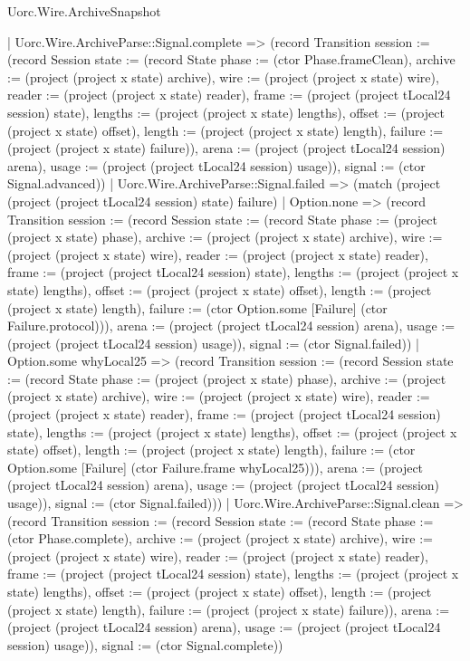 \begin{lexlean}{Uorc.Wire.ArchiveSnapshot}
\begin{semanticmodule}
{        | Uorc.Wire.ArchiveParse::Signal.complete => (record Transition {session := (record Session {state := (record State {phase := (ctor Phase.frameClean), archive := (project (project x state) archive), wire := (project (project x state) wire), reader := (project (project x state) reader), frame := (project (project tLocal24 session) state), lengths := (project (project x state) lengths), offset := (project (project x state) offset), length := (project (project x state) length), failure := (project (project x state) failure)}), arena := (project (project tLocal24 session) arena), usage := (project (project tLocal24 session) usage)}), signal := (ctor Signal.advanced)})
        | Uorc.Wire.ArchiveParse::Signal.failed => (match (project (project (project tLocal24 session) state) failure)
          | Option.none => (record Transition {session := (record Session {state := (record State {phase := (project (project x state) phase), archive := (project (project x state) archive), wire := (project (project x state) wire), reader := (project (project x state) reader), frame := (project (project tLocal24 session) state), lengths := (project (project x state) lengths), offset := (project (project x state) offset), length := (project (project x state) length), failure := (ctor Option.some [Failure] (ctor Failure.protocol))}), arena := (project (project tLocal24 session) arena), usage := (project (project tLocal24 session) usage)}), signal := (ctor Signal.failed)})
          | Option.some whyLocal25 => (record Transition {session := (record Session {state := (record State {phase := (project (project x state) phase), archive := (project (project x state) archive), wire := (project (project x state) wire), reader := (project (project x state) reader), frame := (project (project tLocal24 session) state), lengths := (project (project x state) lengths), offset := (project (project x state) offset), length := (project (project x state) length), failure := (ctor Option.some [Failure] (ctor Failure.frame whyLocal25))}), arena := (project (project tLocal24 session) arena), usage := (project (project tLocal24 session) usage)}), signal := (ctor Signal.failed)}))
        | Uorc.Wire.ArchiveParse::Signal.clean => (record Transition {session := (record Session {state := (record State {phase := (ctor Phase.complete), archive := (project (project x state) archive), wire := (project (project x state) wire), reader := (project (project x state) reader), frame := (project (project tLocal24 session) state), lengths := (project (project x state) lengths), offset := (project (project x state) offset), length := (project (project x state) length), failure := (project (project x state) failure)}), arena := (project (project tLocal24 session) arena), usage := (project (project tLocal24 session) usage)}), signal := (ctor Signal.complete)})
}
\end{semanticmodule}
\end{lexlean}
